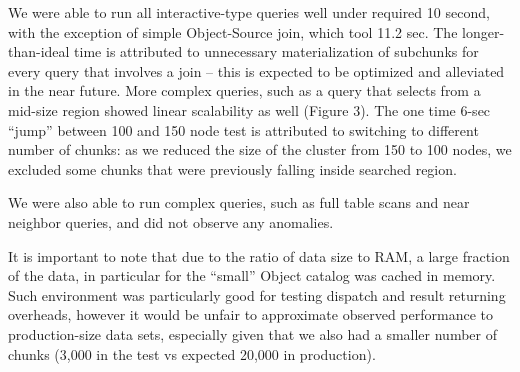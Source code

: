 We were able to run all interactive-type queries well under required 10 second, with the exception of simple Object-Source join, which tool 11.2 sec. The longer-than-ideal time is attributed to unnecessary materialization of subchunks for every query that involves a join – this is expected to be optimized and alleviated in the near future.
More complex queries, such as a query that selects from a mid-size region showed linear scalability as well (Figure 3). The one time 6-sec “jump” between 100 and 150 node test is attributed to switching to different number of chunks: as we reduced the size of the cluster from 150 to 100 nodes, we excluded some chunks that were previously falling inside searched region.

We were also able to run complex queries, such as full table scans and near neighbor queries, and did not observe any anomalies. 

It is important to note that due to the ratio of data size to RAM, a large fraction of the data, in particular for the “small” Object catalog was cached in memory. Such environment was particularly good for testing dispatch and result returning overheads, however it would be unfair to approximate observed performance to production-size data sets, especially given that we also had a smaller number of chunks (3,000 in the test vs expected 20,000 in production).